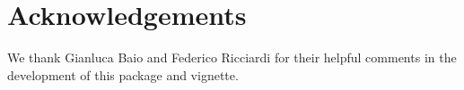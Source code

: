 \documentclass[nojss]{jss}
\begin{document}
\section*{Acknowledgements}

We thank Gianluca Baio and Federico Ricciardi for their helpful comments in the development of this package and vignette.






\end{document}
